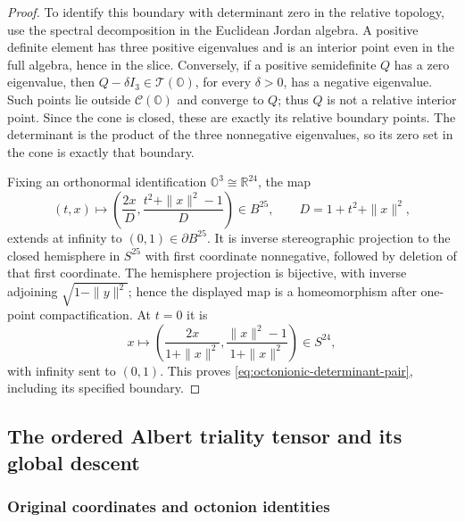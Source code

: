 \documentclass[11pt]{article}
\theoremstyle{definition}
\newcommand{\R}{\mathbb R}
\newcommand{\Oo}{\mathbb O}
\begin{document}
\begin{proof}
To identify this boundary with determinant zero in the relative topology,
use the spectral decomposition in the Euclidean Jordan algebra.
A positive definite element has three positive eigenvalues and is an
interior point even in the full algebra, hence in the slice.  Conversely,
if a positive semidefinite \(Q\) has a zero eigenvalue, then
\(Q-\delta I_3\in\mathcal T(\Oo)\), for every \(\delta>0\), has a
negative eigenvalue.  Such points lie outside \(\mathcal C(\Oo)\) and
converge to \(Q\); thus \(Q\) is not a relative interior point.
Since the cone is closed, these are exactly its relative boundary points.
The determinant is the product of the three nonnegative eigenvalues, so
its zero set in the cone is exactly that boundary.

Fixing an orthonormal identification \(\Oo^3\cong\R^{24}\), the map
\[
 (t,x)\longmapsto
 \left(\frac{2x}{D},\frac{t^2+\|x\|^2-1}{D}\right)\in B^{25},
 \qquad D=1+t^2+\|x\|^2,
\]
extends at infinity to \((0,1)\in\partial B^{25}\).
It is inverse stereographic projection to the closed hemisphere in
\(S^{25}\) with first coordinate nonnegative, followed by deletion of
that first coordinate.  The hemisphere projection is bijective, with
inverse adjoining \(\sqrt{1-\|y\|^2}\); hence the displayed map is a
homeomorphism after one-point compactification.  At \(t=0\) it is
\[
 x\longmapsto
 \left(\frac{2x}{1+\|x\|^2},
       \frac{\|x\|^2-1}{1+\|x\|^2}\right)\in S^{24},
\]
with infinity sent to \((0,1)\).  This proves
\eqref{eq:octonionic-determinant-pair}, including its specified boundary.
\end{proof}

\subsection{The ordered Albert triality tensor and its global descent}
\label{att:sec:ordered-tensor}

\subsubsection{Original coordinates and octonion identities}
\end{document}
